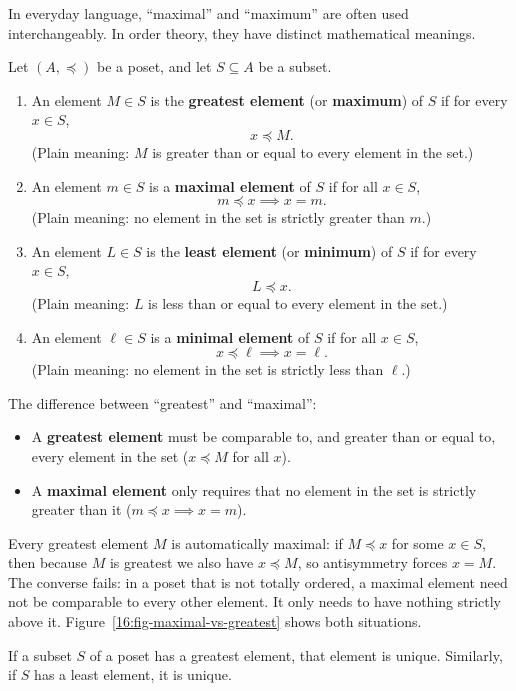 In everyday language, ``maximal'' and ``maximum'' are often used interchangeably. In order theory, they have distinct mathematical meanings.

\begin{definition}
Let $(A, \preceq)$ be a poset, and let $S \subseteq A$ be a subset.
\begin{enumerate}[label=(\roman*)]
\item An element $M \in S$ is the \textbf{greatest element} (or \textbf{maximum}) of $S$ if for every $x \in S$,
\[
x \preceq M.
\]
(Plain meaning: $M$ is greater than or equal to every element in the set.)
\item An element $m \in S$ is a \textbf{maximal element} of $S$ if for all $x \in S$,
\[
m \preceq x \implies x = m.
\]
(Plain meaning: no element in the set is strictly greater than $m$.)
\item An element $L \in S$ is the \textbf{least element} (or \textbf{minimum}) of $S$ if for every $x \in S$,
\[
L \preceq x.
\]
(Plain meaning: $L$ is less than or equal to every element in the set.)
\item An element $\ell \in S$ is a \textbf{minimal element} of $S$ if for all $x \in S$,
\[
x \preceq \ell \implies x = \ell.
\]
(Plain meaning: no element in the set is strictly less than $\ell$.)
\end{enumerate}
\end{definition}

The difference between ``greatest'' and ``maximal'':
\begin{itemize}
\item A \textbf{greatest element} must be comparable to, and greater than or equal to, every element in the set ($x \preceq M$ for all $x$).
\item A \textbf{maximal element} only requires that no element in the set is strictly greater than it ($m \preceq x \implies x = m$).
\end{itemize}

Every greatest element $M$ is automatically maximal: if $M \preceq x$ for some $x \in S$, then because $M$ is greatest we also have $x \preceq M$, so antisymmetry forces $x = M$. The converse fails: in a poset that is not totally ordered, a maximal element need not be comparable to every other element. It only needs to have nothing strictly above it. Figure~\ref{16:fig-maximal-vs-greatest} shows both situations.

\begin{theorem}
If a subset $S$ of a poset has a greatest element, that element is unique. Similarly, if $S$ has a least element, it is unique.
\end{theorem}

